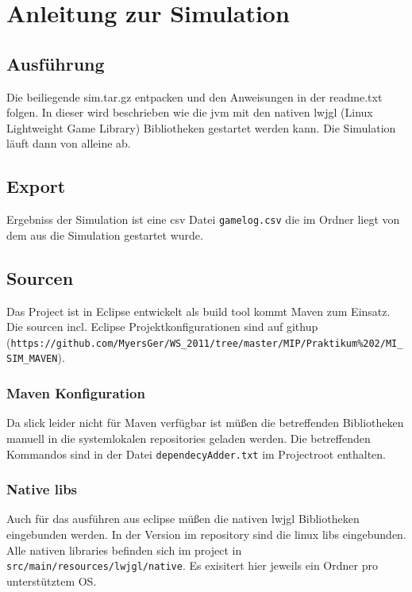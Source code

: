 \documentclass[10pt]{scrartcl}
\author{André Harms, Oliver Steenbuck, Armin Steudte  \\ Carsten Noetzel, Dennis Blauhut, Torben Becker}
\title{\titletext}
\date{11.01.2012}
\begin{document}
\maketitle

\setcounter{tocdepth}{3}
\tableofcontents

	\listoftables                                 												%
	\listoffigures   

\section{Anleitung zur Simulation}

\subsection{Ausführung}
Die beiliegende sim.tar.gz entpacken und den Anweisungen in der readme.txt folgen.
In dieser wird beschrieben wie die jvm mit den nativen lwjgl (Linux Lightweight Game Library) Bibliotheken gestartet werden kann. Die Simulation läuft dann von alleine ab.
\subsection{Export}
Ergebniss der Simulation ist eine csv Datei \verb!gamelog.csv! die im Ordner liegt von dem aus die Simulation gestartet wurde.


\subsection{Sourcen}
Das Project ist in Eclipse entwickelt als build tool kommt Maven zum Einsatz. Die sourcen incl. Eclipse Projektkonfigurationen sind auf githup (\verb!https://github.com/MyersGer/WS_2011/tree/master/MIP/Praktikum%202/MI_SIM_MAVEN!).

\subsubsection{Maven Konfiguration}
Da slick leider nicht für Maven verfügbar ist müßen die betreffenden Bibliotheken manuell in die systemlokalen repositories geladen werden. Die betreffenden Kommandos sind in der Datei \verb!dependecyAdder.txt! im Projectroot enthalten.

\subsubsection{Native libs}
Auch für das ausführen aus eclipse müßen die nativen lwjgl Bibliotheken eingebunden werden. In der Version im repository sind die linux libs eingebunden. Alle nativen libraries befinden sich im project in \verb!src/main/resources/lwjgl/native!. Es exisitert hier jeweils ein Ordner pro unterstütztem OS.
\end{document}
